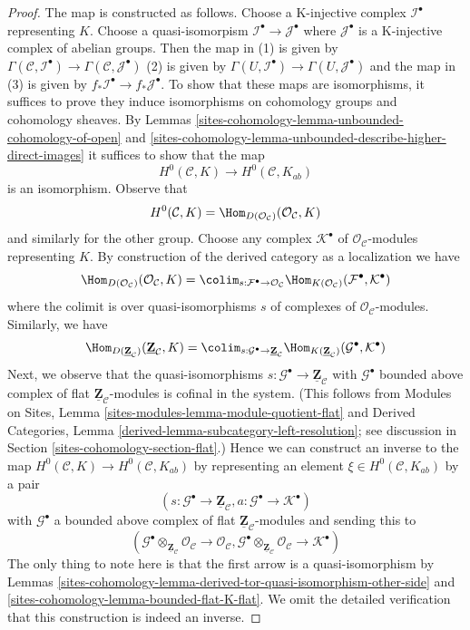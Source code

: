 \begin{proof}
The map is constructed as follows. Choose a K-injective complex
$\mathcal{I}^\bullet$ representing $K$. Choose a quasi-isomorpism
$\mathcal{I}^\bullet \to \mathcal{J}^\bullet$ where $\mathcal{J}^\bullet$
is a K-injective complex of abelian groups. Then the map in
(1) is given by
$\Gamma(\mathcal{C}, \mathcal{I}^\bullet) \to
\Gamma(\mathcal{C}, \mathcal{J}^\bullet)$
(2) is given by
$\Gamma(U, \mathcal{I}^\bullet) \to \Gamma(U, \mathcal{J}^\bullet)$
and the map in (3) is given by
$f_*\mathcal{I}^\bullet \to f_*\mathcal{J}^\bullet$.
To show that these maps are isomorphisms, it suffices to prove
they induce isomorphisms on cohomology groups and cohomology sheaves.
By Lemmas \ref{sites-cohomology-lemma-unbounded-cohomology-of-open} and
\ref{sites-cohomology-lemma-unbounded-describe-higher-direct-images}
it suffices to show that the map
$$
H^0(\mathcal{C}, K) \longrightarrow H^0(\mathcal{C}, K_{ab})
$$
is an isomorphism. Observe that
$$
H^0(\mathcal{C}, K) =
\Hom_{D(\mathcal{O}_\mathcal{C})}(\mathcal{O}_\mathcal{C}, K)
$$
and similarly for the other group. Choose any complex $\mathcal{K}^\bullet$
of $\mathcal{O}_\mathcal{C}$-modules representing $K$. By construction of the
derived category as a localization we have
$$
\Hom_{D(\mathcal{O}_\mathcal{C})}(\mathcal{O}_\mathcal{C}, K) =
\colim_{s : \mathcal{F}^\bullet \to \mathcal{O}_\mathcal{C}}
\Hom_{K(\mathcal{O}_\mathcal{C})}(\mathcal{F}^\bullet, \mathcal{K}^\bullet)
$$
where the colimit is over quasi-isomorphisms $s$ of complexes of
$\mathcal{O}_\mathcal{C}$-modules. Similarly, we have
$$
\Hom_{D(\underline{\mathbf{Z}}_\mathcal{C})}
(\underline{\mathbf{Z}}_\mathcal{C}, K) =
\colim_{s : \mathcal{G}^\bullet \to \underline{\mathbf{Z}}_\mathcal{C}}
\Hom_{K(\underline{\mathbf{Z}}_\mathcal{C})}
(\mathcal{G}^\bullet, \mathcal{K}^\bullet)
$$
Next, we observe that the quasi-isomorphisms
$s : \mathcal{G}^\bullet \to \underline{\mathbf{Z}}_\mathcal{C}$
with $\mathcal{G}^\bullet$ bounded above complex of flat
$\underline{\mathbf{Z}}_\mathcal{C}$-modules is cofinal in the system.
(This follows from Modules on Sites, Lemma
\ref{sites-modules-lemma-module-quotient-flat} and
Derived Categories, Lemma \ref{derived-lemma-subcategory-left-resolution};
see discussion in Section \ref{sites-cohomology-section-flat}.)
Hence we can construct an inverse to the map
$H^0(\mathcal{C}, K) \longrightarrow H^0(\mathcal{C}, K_{ab})$
by representing an element $\xi \in H^0(\mathcal{C}, K_{ab})$ by a pair
$$
(s : \mathcal{G}^\bullet \to \underline{\mathbf{Z}}_\mathcal{C},
a : \mathcal{G}^\bullet \to \mathcal{K}^\bullet)
$$
with $\mathcal{G}^\bullet$ a bounded above complex of flat
$\underline{\mathbf{Z}}_\mathcal{C}$-modules and sending this to
$$
(\mathcal{G}^\bullet \otimes_{\underline{\mathbf{Z}}_\mathcal{C}}
\mathcal{O}_\mathcal{C}
\to \mathcal{O}_\mathcal{C},
\mathcal{G}^\bullet  \otimes_{\underline{\mathbf{Z}}_\mathcal{C}}
\mathcal{O}_\mathcal{C}
\to \mathcal{K}^\bullet)
$$
The only thing to note here is that the first arrow
is a quasi-isomorphism by
Lemmas \ref{sites-cohomology-lemma-derived-tor-quasi-isomorphism-other-side} and
\ref{sites-cohomology-lemma-bounded-flat-K-flat}.
We omit the detailed verification that this construction
is indeed an inverse.
\end{proof}

